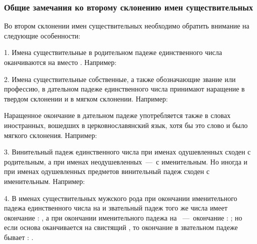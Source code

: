 \documentclass[11pt,a4paper,oneside]{memoir}
\begin{document}
                \subsubsection{Общие замечания ко второму склонению имен существительных}

    Во втором склонении имен существительных необходимо обратить внимание на следующие особенности:
    
    1. Имена существительные {} в родительном падеже единственного числа оканчиваются на {} вместо {}. Например:
    
    \bigskip{}

    2. Имена существительные собственные, а также обозначающие звание или профессию, в дательном падеже единственного числа принимают наращение {} в твердом склонении и {} в мягком склонении. Например:
    
    \bigskip{}

    Наращенное окончание {} в дательном падеже употребляется также в словах иностранных, вошедших в церковнославянский язык, хотя бы это слово и было мягкого склонения. Например:
    
    \bigskip{}

    3. Винительный падеж единственного числа при именах одушевленных сходен с родительным, а при именах неодушевленных~---~с именительным. Но иногда и при именах одушевленных предметов винительный падеж сходен с именительным. Например:
    
    \bigskip{}

    4. В именах существительных мужского рода при окончании именительного падежа единственного числа на {} и {} звательный падеж того же числа имеет окончание {}: {}, а при окончании именительного падежа на {}~---~окончание {}: {}; но если основа оканчивается на свистящий {}, то окончание в звательном падеже бывает {}: {}.
    
\end{document}
